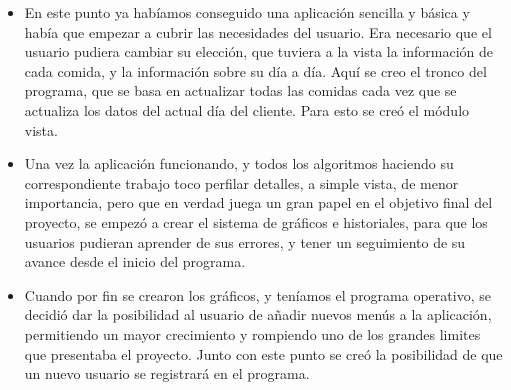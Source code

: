 \begin{itemize}
\item	En este punto ya habíamos conseguido una aplicación sencilla y básica y había que empezar a cubrir las necesidades del usuario. Era necesario que el usuario pudiera cambiar su elección, que tuviera a la vista la información de cada comida, y la información sobre su día a día. Aquí se creo el tronco del programa, que se basa en actualizar todas las comidas cada vez que se actualiza los datos del actual día del cliente. Para esto se creó el módulo vista.
\item	Una vez la aplicación funcionando, y todos los algoritmos haciendo su correspondiente trabajo toco perfilar detalles, a simple vista, de menor importancia, pero que en verdad juega un gran papel en el objetivo final del proyecto, se empezó a crear el sistema de gráficos e historiales, para que los usuarios pudieran aprender de sus errores, y tener un seguimiento de su avance desde el inicio del programa.
\item Cuando por fin se crearon los gráficos, y teníamos el programa operativo, se decidió dar la posibilidad al usuario de añadir nuevos menús a la aplicación, permitiendo un mayor crecimiento y rompiendo uno de los grandes limites que presentaba el proyecto. Junto con este punto se creó la posibilidad de que un nuevo usuario se registrará en el programa.

\end{itemize}